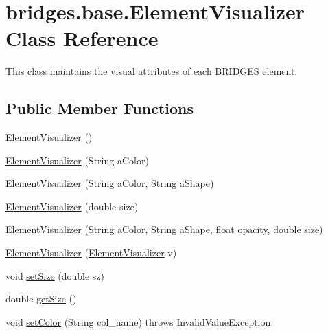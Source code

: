 \hypertarget{classbridges_1_1base_1_1_element_visualizer}{}\section{bridges.\+base.\+Element\+Visualizer Class Reference}
\label{classbridges_1_1base_1_1_element_visualizer}


This class maintains the visual attributes of each B\+R\+I\+D\+G\+ES element.  


\subsection*{Public Member Functions}
\begin{DoxyCompactItemize}
\item 
\mbox{\hyperlink{classbridges_1_1base_1_1_element_visualizer_acbca874876ec1e8dbbde6484a4fc056e}{Element\+Visualizer}} ()
\item 
\mbox{\hyperlink{classbridges_1_1base_1_1_element_visualizer_a5c0d9fe8051ebc816372b9836689fdfa}{Element\+Visualizer}} (String a\+Color)
\item 
\mbox{\hyperlink{classbridges_1_1base_1_1_element_visualizer_ab62b1b06907fbeddfcee2b4b297e1021}{Element\+Visualizer}} (String a\+Color, String a\+Shape)
\item 
\mbox{\hyperlink{classbridges_1_1base_1_1_element_visualizer_ab32f66b72ccf0a26c03ba44006da9ac6}{Element\+Visualizer}} (double size)
\item 
\mbox{\hyperlink{classbridges_1_1base_1_1_element_visualizer_a9bf06ca1b6c215e079ab33ccd99633e8}{Element\+Visualizer}} (String a\+Color, String a\+Shape, float opacity, double size)
\item 
\mbox{\hyperlink{classbridges_1_1base_1_1_element_visualizer_a5b48cbda94a4e84e40de41fe156e2497}{Element\+Visualizer}} (\mbox{\hyperlink{classbridges_1_1base_1_1_element_visualizer}{Element\+Visualizer}} v)
\item 
void \mbox{\hyperlink{classbridges_1_1base_1_1_element_visualizer_aba410184f7df495594fc1fa7948335a5}{set\+Size}} (double sz)
\item 
double \mbox{\hyperlink{classbridges_1_1base_1_1_element_visualizer_a0b7673bf724e3df1f94df50ad95ca5b1}{get\+Size}} ()
\item 
void \mbox{\hyperlink{classbridges_1_1base_1_1_element_visualizer_ad7ff2a772741301c08943a58ffccca38}{set\+Color}} (String col\+\_\+name)  throws Invalid\+Value\+Exception 

\end{DoxyCompactItemize}
